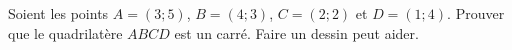 
\begin{exercice}\label{exoSeconde-0078}

    Soient les points \( A=(3;5)\), \( B=(4;3)\), \( C=(2;2)\) et \( D=(1;4)\). Prouver que le quadrilatère \( ABCD\) est un carré. Faire un dessin peut aider.

\end{exercice}
